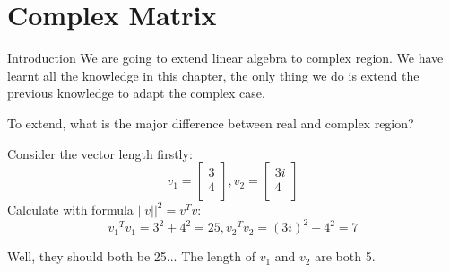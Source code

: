 \documentclass{beamer}
\begin{document}
\section{Complex Matrix}
\begin{frame}{Introduction}
We are going to extend linear algebra to complex region. We have learnt all the knowledge in this chapter, the only thing we do is extend the previous knowledge to adapt the complex case.

\vspace{3pt}
To extend, what is the major difference between real and complex region?

\vspace{3pt}
Consider the vector length firstly:
\begin{equation*}
    v_1=\left[ \begin{array}{c}
        3\\
        4\\
    \end{array} \right] , v_2=\left[ \begin{array}{c}
        3i\\
        4\\
    \end{array} \right]
\end{equation*}
Calculate with formula $||v||^2=v^Tv$:
\begin{equation*}
    {v_1}^Tv_1=3^2+4^2=25, {v_2}^Tv_2=\left( 3i \right) ^2+4^2=7
\end{equation*}

Well, they should both be 25... The length of $v_1$ and $v_2$ are both 5.
\end{frame}
\end{document}
